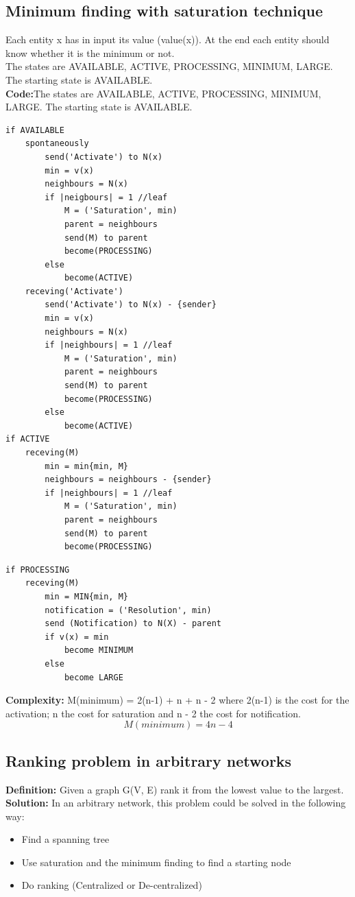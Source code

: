\documentclass[paper=a4, fontsize=11pt]{scrartcl} %
\numberwithin{equation}{section} %
\numberwithin{figure}{section} %
\numberwithin{table}{section} %
\begin{document}
\subsection*{Minimum finding with saturation technique}
Each entity x has in input its value (value(x)). At the end each entity should know whether it is the minimum or not.\\
The states are AVAILABLE, ACTIVE, PROCESSING, MINIMUM, LARGE. The starting state is AVAILABLE.\\
\textbf{Code:}The states are AVAILABLE, ACTIVE, PROCESSING, MINIMUM, LARGE. The starting state is AVAILABLE.
\begin{lstlisting}
if AVAILABLE
	spontaneously
		send('Activate') to N(x)
		min = v(x)
		neighbours = N(x)
		if |neigbours| = 1 //leaf
			M = ('Saturation', min)
			parent = neighbours
			send(M) to parent
			become(PROCESSING)
		else
			become(ACTIVE)
	receving('Activate')
		send('Activate') to N(x) - {sender}
		min = v(x)
		neighbours = N(x)
		if |neighbours| = 1	//leaf
			M = ('Saturation', min)
			parent = neighbours
			send(M) to parent
			become(PROCESSING)
		else
			become(ACTIVE)
if ACTIVE
	receving(M)
		min = min{min, M}
		neighbours = neighbours - {sender}
		if |neighbours| = 1 //leaf
			M = ('Saturation', min)
			parent = neighbours	
			send(M) to parent
			become(PROCESSING)
\end{lstlisting}
\newpage
\begin{lstlisting}			
if PROCESSING
	receving(M)
		min = MIN{min, M}
		notification = ('Resolution', min)
		send (Notification) to N(X) - parent
		if v(x) = min
			become MINIMUM
		else
			become LARGE									
\end{lstlisting}
\textbf{Complexity:} M(minimum) = 2(n-1) + n + n - 2 where 2(n-1) is the cost for the activation; n the cost for saturation and n - 2 the cost for notification.\\
$$M(minimum) = 4n - 4$$
\subsection*{Ranking problem in arbitrary networks}
\textbf{Definition:} Given a graph G(V, E) rank it from the lowest value to the largest.\\
\textbf{Solution:} In an arbitrary network, this problem could be solved in the following way:
\begin{itemize}
\item Find a spanning tree
\item Use saturation and the minimum finding to find a starting node
\item Do ranking (Centralized or De-centralized)
\end{itemize}
\end{document}
